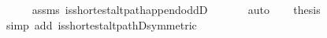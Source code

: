 \begin{isabellebody}
\ \ \ \ \isamarkupfalse%
\ assms\ is{\isacharunderscore}{\kern0pt}shortest{\isacharunderscore}{\kern0pt}alt{\isacharunderscore}{\kern0pt}path{\isacharunderscore}{\kern0pt}append{\isacharunderscore}{\kern0pt}oddD{\isacharparenleft}{\kern0pt}{}{\isacharcomma}{\kern0pt}\ {}{\isacharparenright}{\kern0pt}\isanewline
\ \ \ \ \isamarkupfalse%
\ auto\isanewline
\ \ \isamarkupfalse%
\ {\isacharquery}{\kern0pt}thesis\isanewline
\ \ \ \ \isamarkupfalse%
\ {\isacharparenleft}{\kern0pt}simp\ add{\isacharcolon}{\kern0pt}\ is{\isacharunderscore}{\kern0pt}shortest{\isacharunderscore}{\kern0pt}alt{\isacharunderscore}{\kern0pt}pathD{\isacharparenleft}{\kern0pt}{}{\isacharparenright}{\kern0pt}{\isacharbrackleft}{\kern0pt}symmetric{\isacharbrackright}{\kern0pt}{\isacharparenright}{\kern0pt}\isanewline
{}\isamarkupfalse%
%
\endisatagproof
{\isafoldproof}%
%
\isadelimproof
\isanewline
%
\endisadelimproof
%
\isadelimtheory
\isanewline
%
\endisadelimtheory
%
\isatagtheory
{}\isamarkupfalse%
%
\endisatagtheory
{\isafoldtheory}%
%
\isadelimtheory
%
\endisadelimtheory
%
\end{isabellebody}%
\endinput
